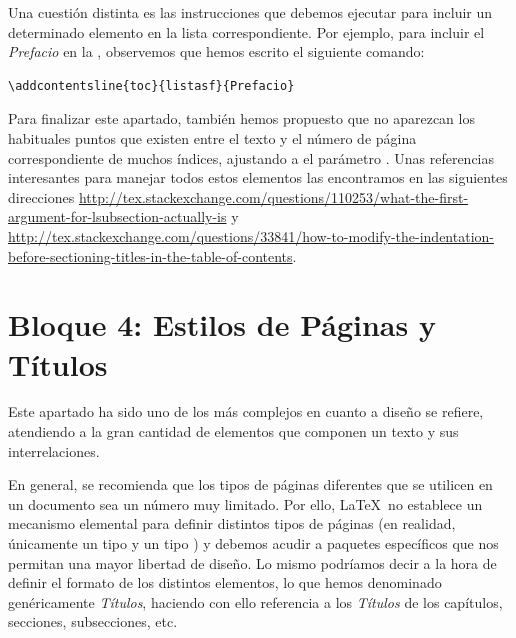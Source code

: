 Una cuestión distinta es las instrucciones que debemos ejecutar para incluir un determinado elemento en la lista correspondiente. Por ejemplo, para incluir el \emph{Prefacio} en la  , observemos que hemos escrito el siguiente comando: 
\begin{lstlisting}[frame=none]
\addcontentsline{toc}{listasf}{Prefacio}
\end{lstlisting}

Para finalizar este apartado, también hemos propuesto que no aparezcan los habituales puntos que existen entre el texto y el número de página correspondiente de muchos índices, ajustando a  el parámetro \ttcolor{\textbackslash@dotsep}. Unas referencias interesantes para manejar todos estos elementos las encontramos en las siguientes direcciones \url{http://tex.stackexchange.com/questions/110253/what-the-first-argument-for-lsubsection-actually-is} y \url{http://tex.stackexchange.com/questions/33841/how-to-modify-the-indentation-before-sectioning-titles-in-the-table-of-contents}.

\section{Bloque 4: Estilos de Páginas y Títulos}
Este apartado ha sido uno de los más complejos en cuanto a diseño se refiere, atendiendo a la gran cantidad de elementos que componen un texto y sus interrelaciones. 

En general, se recomienda que los tipos de páginas diferentes que se utilicen en un documento sea un número muy limitado. Por ello, \LaTeX\ no establece un mecanismo elemental para definir distintos tipos de páginas (en realidad, únicamente un tipo  y un tipo ) y debemos acudir a paquetes específicos que nos permitan una mayor libertad de diseño. Lo mismo podríamos decir a la hora de definir el formato de los distintos elementos, lo que hemos denominado genéricamente \emph{Títulos}, haciendo con ello referencia a los \emph{Títulos} de los capítulos, secciones, subsecciones, etc. 

